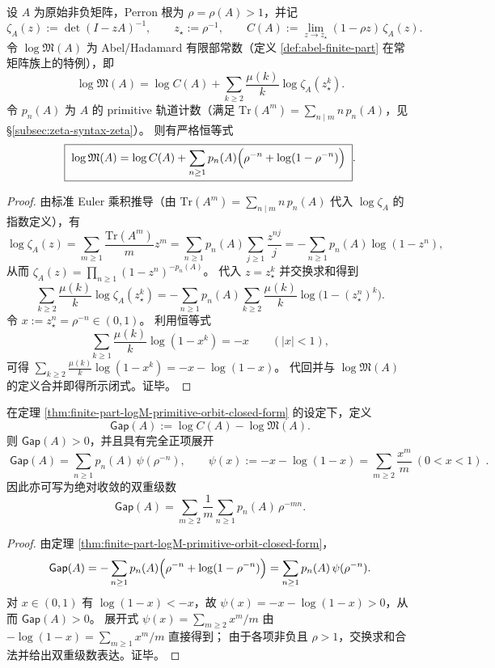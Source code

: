 \begin{theorem}\label{thm:finite-part-logM-primitive-orbit-closed-form}
设 \(A\) 为原始非负矩阵，Perron 根为 \(\rho=\rho(A)>1\)，并记
\[
\zeta_A(z):=\det(I-zA)^{-1},\qquad z_\star:=\rho^{-1},\qquad
C(A):=\lim_{z\to z_\star}(1-\rho z)\,\zeta_A(z).
\]
令 \(\log\mathfrak{M}(A)\) 为 Abel/Hadamard 有限部常数（定义 \ref{def:abel-finite-part} 在常矩阵族上的特例），即
\[
\log\mathfrak{M}(A)
=\log C(A)+\sum_{k\ge 2}\frac{\mu(k)}{k}\log \zeta_A(z_\star^{k}).
\]
令 \(p_n(A)\) 为 \(A\) 的 primitive 轨道计数（满足
\(\mathrm{Tr}(A^m)=\sum_{n\mid m} n\,p_n(A)\)，见 \S\ref{subsec:zeta-syntax-zeta}）。
则有严格恒等式
\[
\boxed{\;
\log\mathfrak{M}(A)
=\log C(A)+\sum_{n\ge 1}p_n(A)\Bigl(\rho^{-n}+\log(1-\rho^{-n})\Bigr)\; }.
\]
\end{theorem}
\begin{proof}
由标准 Euler 乘积推导（由 \(\mathrm{Tr}(A^m)=\sum_{n\mid m}n\,p_n(A)\) 代入 \(\log\zeta_A\) 的指数定义），有
\[
\log\zeta_A(z)
=\sum_{m\ge 1}\frac{\mathrm{Tr}(A^m)}{m}z^m
=\sum_{n\ge 1}p_n(A)\sum_{j\ge 1}\frac{z^{nj}}{j}
=-\sum_{n\ge 1}p_n(A)\log(1-z^n),
\]
从而 \(\zeta_A(z)=\prod_{n\ge 1}(1-z^n)^{-p_n(A)}\)。
代入 \(z=z_\star^k\) 并交换求和得到
\[
\sum_{k\ge 2}\frac{\mu(k)}{k}\log\zeta_A(z_\star^k)
=-\sum_{n\ge 1}p_n(A)\sum_{k\ge 2}\frac{\mu(k)}{k}\log\!\bigl(1-(z_\star^n)^k\bigr).
\]
令 \(x:=z_\star^n=\rho^{-n}\in(0,1)\)。
利用恒等式
\[
\sum_{k\ge 1}\frac{\mu(k)}{k}\log(1-x^k)=-x\qquad(|x|<1),
\]
可得
\(
\sum_{k\ge 2}\frac{\mu(k)}{k}\log(1-x^k)=-x-\log(1-x)
\)。
代回并与 \(\log\mathfrak{M}(A)\) 的定义合并即得所示闭式。证毕。
\end{proof}

\begin{corollary}\label{cor:finite-part-logM-gap-positive}
在定理 \ref{thm:finite-part-logM-primitive-orbit-closed-form} 的设定下，定义
\[
\mathsf{Gap}(A):=\log C(A)-\log\mathfrak{M}(A).
\]
则 \(\mathsf{Gap}(A)>0\)，并且具有完全正项展开
\[
\boxed{\;
\mathsf{Gap}(A)=\sum_{n\ge 1}p_n(A)\,\psi(\rho^{-n}),
\qquad
\psi(x):=-x-\log(1-x)=\sum_{m\ge 2}\frac{x^{m}}{m}\ (0<x<1)\; }.
\]
因此亦可写为绝对收敛的双重级数
\[
\mathsf{Gap}(A)=\sum_{m\ge 2}\frac{1}{m}\sum_{n\ge 1}p_n(A)\,\rho^{-mn}.
\]
\end{corollary}
\begin{proof}
由定理 \ref{thm:finite-part-logM-primitive-orbit-closed-form}，
\[
\mathsf{Gap}(A)
=-\sum_{n\ge 1}p_n(A)\Bigl(\rho^{-n}+\log(1-\rho^{-n})\Bigr)
=\sum_{n\ge 1}p_n(A)\,\psi(\rho^{-n}).
\]
对 \(x\in(0,1)\) 有 \(\log(1-x)<-x\)，故 \(\psi(x)=-x-\log(1-x)>0\)，从而 \(\mathsf{Gap}(A)>0\)。
展开式 \(\psi(x)=\sum_{m\ge 2}x^m/m\) 由 \(-\log(1-x)=\sum_{m\ge 1}x^m/m\) 直接得到；
由于各项非负且 \(\rho>1\)，交换求和合法并给出双重级数表达。证毕。
\end{proof}

